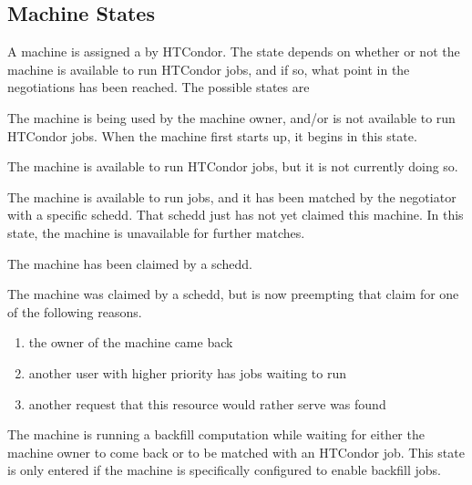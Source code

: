 \subsection{\label{sec:States} Machine States}

A machine is assigned a  by HTCondor.
The state depends on whether or not the machine is available to run HTCondor
jobs, and if so, what point in the negotiations has been reached.
The possible states are

\begin{description}
  
\item[Owner] The machine is being used by the machine owner, and/or
  is not available to run HTCondor jobs.
  When the machine first starts up, it begins in this state.
  
\item[Unclaimed] The machine is available to run HTCondor jobs, but it is
  not currently doing so.
  
\item[Matched] The machine is available to run jobs, and it has been
  matched by the negotiator with a specific schedd.
  That schedd just has not yet claimed this machine.
  In this state, the machine is unavailable for further matches.

\item[Claimed] The machine has been claimed by a schedd. 
  
\item[Preempting] The machine was claimed by a schedd, but is now
  preempting that claim for one of the following reasons.
  \begin{enumerate}
  \item the owner of the machine came back
  \item another user with higher priority has jobs waiting to run
  \item another request that this resource would rather serve was found
  \end{enumerate}

\item[Backfill] The machine is running a backfill computation while
  waiting for either the machine owner to come back or to be matched
  with an HTCondor job.
  This state is only entered if the machine is specifically configured
  to enable backfill jobs.


\end{description}
